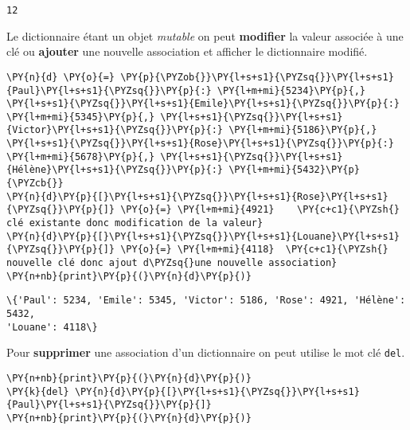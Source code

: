 \documentclass[12pt]{book}
\begin{document}
            \begin{tcolorbox}[breakable, size=fbox, boxrule=.5pt, pad at break*=1mm, opacityfill=0]
\begin{Verbatim}[commandchars=\\\{\}]
12
\end{Verbatim}
\end{tcolorbox}
        
    Le dictionnaire étant un objet \emph{mutable} on peut \textbf{modifier}
la valeur associée à une clé ou \textbf{ajouter} une nouvelle
association et afficher le dictionnaire modifié.

    \begin{tcolorbox}[breakable, size=fbox, boxrule=1pt, pad at break*=1mm,colback=cellbackground, colframe=cellborder]
\begin{Verbatim}[commandchars=\\\{\}]
\PY{n}{d} \PY{o}{=} \PY{p}{\PYZob{}}\PY{l+s+s1}{\PYZsq{}}\PY{l+s+s1}{Paul}\PY{l+s+s1}{\PYZsq{}}\PY{p}{:} \PY{l+m+mi}{5234}\PY{p}{,} \PY{l+s+s1}{\PYZsq{}}\PY{l+s+s1}{Emile}\PY{l+s+s1}{\PYZsq{}}\PY{p}{:} \PY{l+m+mi}{5345}\PY{p}{,} \PY{l+s+s1}{\PYZsq{}}\PY{l+s+s1}{Victor}\PY{l+s+s1}{\PYZsq{}}\PY{p}{:} \PY{l+m+mi}{5186}\PY{p}{,} \PY{l+s+s1}{\PYZsq{}}\PY{l+s+s1}{Rose}\PY{l+s+s1}{\PYZsq{}}\PY{p}{:} \PY{l+m+mi}{5678}\PY{p}{,} \PY{l+s+s1}{\PYZsq{}}\PY{l+s+s1}{Hélène}\PY{l+s+s1}{\PYZsq{}}\PY{p}{:} \PY{l+m+mi}{5432}\PY{p}{\PYZcb{}}
\PY{n}{d}\PY{p}{[}\PY{l+s+s1}{\PYZsq{}}\PY{l+s+s1}{Rose}\PY{l+s+s1}{\PYZsq{}}\PY{p}{]} \PY{o}{=} \PY{l+m+mi}{4921}    \PY{c+c1}{\PYZsh{} clé existante donc modification de la valeur}
\PY{n}{d}\PY{p}{[}\PY{l+s+s1}{\PYZsq{}}\PY{l+s+s1}{Louane}\PY{l+s+s1}{\PYZsq{}}\PY{p}{]} \PY{o}{=} \PY{l+m+mi}{4118}  \PY{c+c1}{\PYZsh{} nouvelle clé donc ajout d\PYZsq{}une nouvelle association}
\PY{n+nb}{print}\PY{p}{(}\PY{n}{d}\PY{p}{)}
\end{Verbatim}
\end{tcolorbox}

    \begin{Verbatim}[commandchars=\\\{\}]
\{'Paul': 5234, 'Emile': 5345, 'Victor': 5186, 'Rose': 4921, 'Hélène': 5432,
'Louane': 4118\}
    \end{Verbatim}

    Pour \textbf{supprimer} une association d'un dictionnaire on peut
utilise le mot clé \texttt{del}.

    \begin{tcolorbox}[breakable, size=fbox, boxrule=1pt, pad at break*=1mm,colback=cellbackground, colframe=cellborder]
\begin{Verbatim}[commandchars=\\\{\}]
\PY{n+nb}{print}\PY{p}{(}\PY{n}{d}\PY{p}{)}
\PY{k}{del} \PY{n}{d}\PY{p}{[}\PY{l+s+s1}{\PYZsq{}}\PY{l+s+s1}{Paul}\PY{l+s+s1}{\PYZsq{}}\PY{p}{]}
\PY{n+nb}{print}\PY{p}{(}\PY{n}{d}\PY{p}{)}
\end{Verbatim}
\end{tcolorbox}
\end{document}
